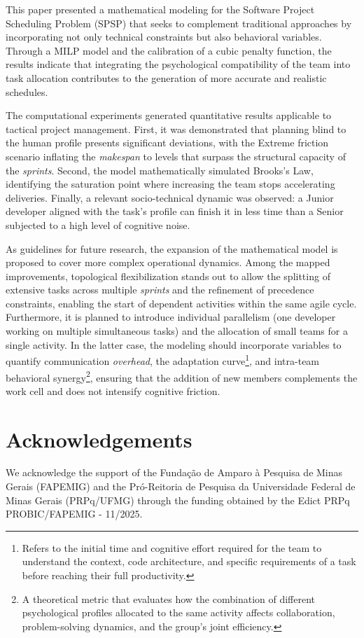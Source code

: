 \documentclass[a4paper,11pt]{article}
\begin{document}
This paper presented a mathematical modeling for the Software Project 
Scheduling Problem (SPSP) that seeks to complement traditional approaches by 
incorporating not only technical constraints but also behavioral variables. 
Through a MILP model and the calibration of a cubic penalty function, the 
results indicate that integrating the psychological compatibility of the team 
into task allocation contributes to the generation of more accurate and 
realistic schedules.

The computational experiments generated quantitative results applicable to 
tactical project management. First, it was demonstrated that planning blind 
to the human profile presents significant deviations, with the Extreme 
friction scenario inflating the \textit{makespan} to levels that surpass the 
structural capacity of the \textit{sprints}. Second, the model mathematically 
simulated Brooks's Law, identifying the saturation point where increasing the 
team stops accelerating deliveries. Finally, a relevant socio-technical 
dynamic was observed: a Junior developer aligned with the task's profile can 
finish it in less time than a Senior subjected to a high level of cognitive noise.

As guidelines for future research, the expansion of the mathematical model is 
proposed to cover more complex operational dynamics. Among the mapped 
improvements, topological flexibilization stands out to allow the splitting 
of extensive tasks across multiple \textit{sprints} and the refinement of 
precedence constraints, enabling the start of dependent activities within the 
same agile cycle. Furthermore, it is planned to introduce individual parallelism 
(one developer working on multiple simultaneous tasks) and the allocation of 
small teams for a single activity. In the latter case, the modeling should 
incorporate variables to quantify communication \textit{overhead}, the 
adaptation curve\footnote{Refers to the initial time and cognitive effort 
required for the team to understand the context, code architecture, and specific 
requirements of a task before reaching their full productivity.}, and intra-team 
behavioral synergy\footnote{A theoretical metric that evaluates how the 
combination of different psychological profiles allocated to the same activity 
affects collaboration, problem-solving dynamics, and the group's joint efficiency.}, 
ensuring that the addition of new members complements the work cell and does 
not intensify cognitive friction.

\section*{Acknowledgements}

We acknowledge the support of the Fundação de Amparo à Pesquisa de Minas Gerais 
(FAPEMIG) and the Pró-Reitoria de Pesquisa da Universidade Federal de Minas 
Gerais (PRPq/UFMG) through the funding obtained by the Edict PRPq 
PROBIC/FAPEMIG - 11/2025.



\end{document}
